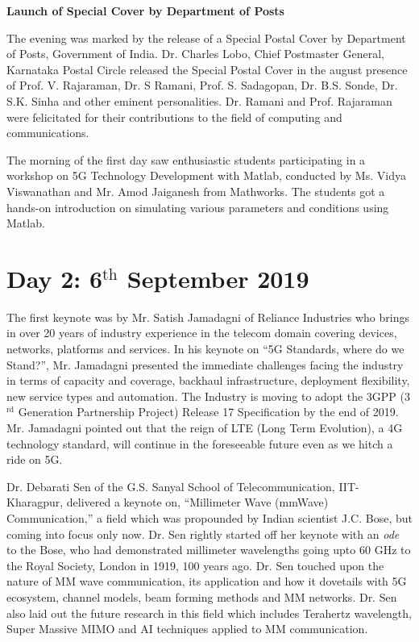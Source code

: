 \begin{multicols}{2}
\noindent
\textbf{Launch of Special Cover by Department of Posts}

The evening was marked by the release of a Special Postal Cover by Department of Posts, Government of India. Dr. Charles Lobo, Chief Postmaster General, Karnataka Postal Circle released the Special Postal Cover in the august presence of Prof. V. Rajaraman, Dr. S Ramani, Prof. S. Sadagopan, Dr. B.S. Sonde, Dr. S.K. Sinha and other eminent personalities. Dr. Ramani and Prof. Rajaraman were felicitated for their contributions to the field of computing and communications.

The morning of the first day saw enthusiastic students participating in a workshop on 5G Technology Development with Matlab, conducted by Ms. Vidya Viswanathan and Mr. Amod Jaiganesh from Mathworks. The students got a hands-on introduction on simulating various parameters and conditions using Matlab.

\section*{Day 2: 6$^{\text{th}}$ September 2019}

The first keynote was by Mr. Satish Jamadagni of Reliance Industries who brings in over 20 years of industry experience in the telecom domain covering devices, networks, platforms and services. In his keynote on “5G Standards, where do we Stand?”, Mr. Jamadagni presented the immediate challenges facing the industry in terms of capacity and coverage, backhaul infrastructure, deployment flexibility, new service types and automation. The Industry is moving to adopt the 3GPP (3$^{\text{rd}}$ Generation Partnership Project) Release 17 Specification by the end of 2019. Mr. Jamadagni pointed out that the reign of LTE (Long Term Evolution), a 4G technology standard, will continue in the foreseeable future even as we hitch a ride on 5G.

Dr. Debarati Sen of the G.S. Sanyal School of Telecommunication, IIT-Kharagpur, delivered a keynote on, “Millimeter Wave (mmWave) Communication,” a field which was propounded by Indian scientist J.C. Bose, but coming into focus only now. Dr. Sen rightly started off her keynote with an \textit{ode} to the Bose, who had demonstrated millimeter wavelengths going upto 60 GHz to the Royal Society, London in 1919, 100 years ago. Dr. Sen touched upon the nature of MM wave communication, its application and how it dovetails with 5G ecosystem, channel models, beam forming methods and MM networks. Dr. Sen also laid out the future research in this field which includes Terahertz wavelength, Super Massive MIMO and AI techniques applied to MM communication.


\end{multicols}
